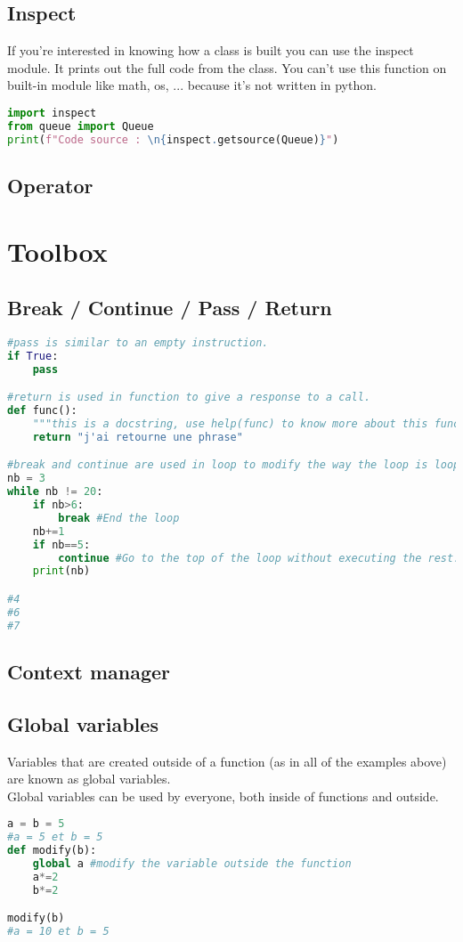 \documentclass[a4paper, 12pt, titlepage]{scrartcl} %
\begin{document}
\subsection{Inspect}
If you're interested in knowing how a class is built you can use the inspect module. It prints out the full code from the class. You can't use this function on built-in module like math, os, ... because it's not written in python.
\begin{lstlisting}[language=Python]
import inspect
from queue import Queue
print(f"Code source : \n{inspect.getsource(Queue)}")
\end{lstlisting}

\subsection{Operator}

\newpage
\section{Toolbox}
\subsection{Break / Continue / Pass / Return}
\label{subsec:BCPR}
\begin{lstlisting}[language=Python]
#pass is similar to an empty instruction.
if True:
    pass

#return is used in function to give a response to a call.
def func():
	"""this is a docstring, use help(func) to know more about this function."""
	return "j'ai retourne une phrase"

#break and continue are used in loop to modify the way the loop is looping.
nb = 3
while nb != 20:
	if nb>6:
		break #End the loop
	nb+=1
	if nb==5:
		continue #Go to the top of the loop without executing the rest.	
	print(nb)

#4
#6
#7
\end{lstlisting}

\subsection{Context manager}
\label{subsec:ContextManager}

\subsection{Global variables}
\label{subsec:Global}
Variables that are created outside of a function (as in all of the examples above) are known as global variables.\\
Global variables can be used by everyone, both inside of functions and outside.
\begin{lstlisting}[language=Python]
a = b = 5
#a = 5 et b = 5
def modify(b):
	global a #modify the variable outside the function
	a*=2
	b*=2

modify(b)
#a = 10 et b = 5
\end{lstlisting}
\end{document}
